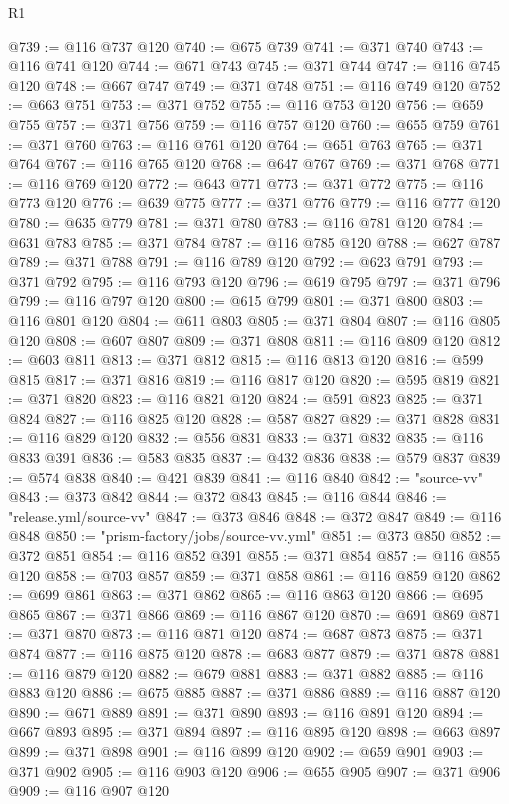 \begin{lexlean}{R1}
\begin{coremodule}
@739 := @116 @737 @120
@740 := @675 @739
@741 := @371 @740
@743 := @116 @741 @120
@744 := @671 @743
@745 := @371 @744
@747 := @116 @745 @120
@748 := @667 @747
@749 := @371 @748
@751 := @116 @749 @120
@752 := @663 @751
@753 := @371 @752
@755 := @116 @753 @120
@756 := @659 @755
@757 := @371 @756
@759 := @116 @757 @120
@760 := @655 @759
@761 := @371 @760
@763 := @116 @761 @120
@764 := @651 @763
@765 := @371 @764
@767 := @116 @765 @120
@768 := @647 @767
@769 := @371 @768
@771 := @116 @769 @120
@772 := @643 @771
@773 := @371 @772
@775 := @116 @773 @120
@776 := @639 @775
@777 := @371 @776
@779 := @116 @777 @120
@780 := @635 @779
@781 := @371 @780
@783 := @116 @781 @120
@784 := @631 @783
@785 := @371 @784
@787 := @116 @785 @120
@788 := @627 @787
@789 := @371 @788
@791 := @116 @789 @120
@792 := @623 @791
@793 := @371 @792
@795 := @116 @793 @120
@796 := @619 @795
@797 := @371 @796
@799 := @116 @797 @120
@800 := @615 @799
@801 := @371 @800
@803 := @116 @801 @120
@804 := @611 @803
@805 := @371 @804
@807 := @116 @805 @120
@808 := @607 @807
@809 := @371 @808
@811 := @116 @809 @120
@812 := @603 @811
@813 := @371 @812
@815 := @116 @813 @120
@816 := @599 @815
@817 := @371 @816
@819 := @116 @817 @120
@820 := @595 @819
@821 := @371 @820
@823 := @116 @821 @120
@824 := @591 @823
@825 := @371 @824
@827 := @116 @825 @120
@828 := @587 @827
@829 := @371 @828
@831 := @116 @829 @120
@832 := @556 @831
@833 := @371 @832
@835 := @116 @833 @391
@836 := @583 @835
@837 := @432 @836
@838 := @579 @837
@839 := @574 @838
@840 := @421 @839
@841 := @116 @840
@842 := "source-vv"
@843 := @373 @842
@844 := @372 @843
@845 := @116 @844
@846 := "release.yml/source-vv"
@847 := @373 @846
@848 := @372 @847
@849 := @116 @848
@850 := "prism-factory/jobs/source-vv.yml"
@851 := @373 @850
@852 := @372 @851
@854 := @116 @852 @391
@855 := @371 @854
@857 := @116 @855 @120
@858 := @703 @857
@859 := @371 @858
@861 := @116 @859 @120
@862 := @699 @861
@863 := @371 @862
@865 := @116 @863 @120
@866 := @695 @865
@867 := @371 @866
@869 := @116 @867 @120
@870 := @691 @869
@871 := @371 @870
@873 := @116 @871 @120
@874 := @687 @873
@875 := @371 @874
@877 := @116 @875 @120
@878 := @683 @877
@879 := @371 @878
@881 := @116 @879 @120
@882 := @679 @881
@883 := @371 @882
@885 := @116 @883 @120
@886 := @675 @885
@887 := @371 @886
@889 := @116 @887 @120
@890 := @671 @889
@891 := @371 @890
@893 := @116 @891 @120
@894 := @667 @893
@895 := @371 @894
@897 := @116 @895 @120
@898 := @663 @897
@899 := @371 @898
@901 := @116 @899 @120
@902 := @659 @901
@903 := @371 @902
@905 := @116 @903 @120
@906 := @655 @905
@907 := @371 @906
@909 := @116 @907 @120

\end{coremodule}
\end{lexlean}
